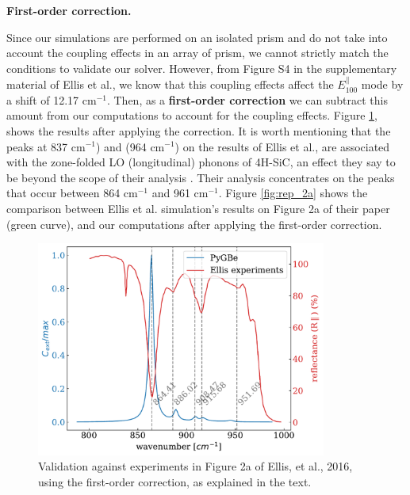  \textbf{First-order correction.} 

Since our simulations are performed on an isolated prism and do not take into account the coupling effects 
in an array of prism, we cannot strictly match the conditions to validate our solver. However, from Figure S4 in the supplementary material of 
Ellis et al., we know that this coupling effects affect the $E^{\parallel}_{100}$ mode by a shift of 12.17 cm$^{-1}$. Then, as a 
\textbf{first-order correction} we can subtract this amount from our computations to account for the coupling effects. Figure \ref{fig:val_2a}, 
shows the results after applying the correction. It is worth mentioning that the peaks at 837 cm$^{-1}$) and (964 cm$^{-1}$) on the results of Ellis et al., 
are associated with the zone-folded LO (longitudinal) phonons of 4H-SiC, an effect they say to be beyond the scope of their analysis \cite{ellis2016}. Their 
analysis concentrates on the peaks that occur between 864 cm$^{-1}$ and 961 cm$^{-1}$. 
Figure \ref{fig:rep_2a} shows the comparison between Ellis et al. simulation's results on Figure 2a of their paper (green curve), and our computations
after applying the first-order correction.

\begin{figure}
    \centering
    \includegraphics[width=0.85\textwidth]{validation_FOA_fig2a_Ellis.pdf} 
    \caption{Validation against experiments in Figure 2a of Ellis, et al., 2016, using the first-order correction, as explained in the text.}
    \label{fig:val_2a}
 \end{figure}

